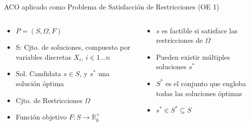 \begin{frame}{ACO aplicado como Problema de Satisfacci\'on de Restricciones (OE 1)}
  \begin{columns}
    \begin{column}{0.5\textwidth}
        \begin{itemize}
          \item $P = (S, \Omega, F)$
          \item S:  Cjto. de soluciones, compuesto por variables discretas $X_{i}$, $i \in 1 \dotsc n$
          \item Sol. Candidata $s \in S$, y $s^{*}$ una soluci\'on \'optima
          \item Cjto. de Restricciones $\Omega$
          \item Funci\'on objetivo $F: S\rightarrow \mathbb R_{0}^{+}$
          
      \end{itemize}
    \end{column}
    \begin{column}{0.5\textwidth}
      \begin{itemize}
          \item $s$ es factible si satisface las restricciones de $\Omega$
          \item Pueden existir m\'ultiples soluciones $s^{*}$
          \item $S^{*}$ es el conjunto que engloba todas las soluciones \'optimas
          \item $s^{*} \in S^{*} \subseteq S$
      \end{itemize}
    \end{column}
\end{columns}
\end{frame}





